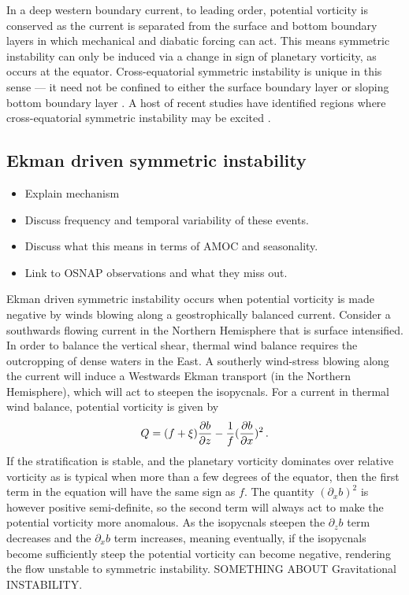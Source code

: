 In a deep western boundary current, to leading order, potential vorticity is conserved as the current is separated from the surface and bottom boundary layers in which mechanical and diabatic forcing can act. This means symmetric instability can only be induced via a change in sign of planetary vorticity, as occurs at the equator. Cross-equatorial symmetric instability is unique in this sense --- it need not be confined to either the surface boundary layer or sloping bottom boundary layer \citep{Haine1998, Wenegrat2020}. A host of recent studies have identified regions where cross-equatorial symmetric instability may be excited \citep{Jakoboski2022, Goldsworth2021, Forryan2021, Zhou2022}.

\subsection{Ekman driven symmetric instability}
\label{sec:EkmanInst}
\begin{itemize}
    \item Explain mechanism
    \item Discuss frequency and temporal variability of these events.
    \item Discuss what this means in terms of AMOC and seasonality.
    \item Link to OSNAP observations and what they miss out.
\end{itemize}
Ekman driven symmetric instability occurs when potential vorticity is made negative by winds blowing along a geostrophically balanced current. Consider a southwards flowing current in the Northern Hemisphere that is surface intensified. In order to balance the vertical shear, thermal wind balance requires the outcropping of dense waters in the East. A southerly wind-stress blowing along the current will induce a Westwards Ekman transport (in the Northern Hemisphere), which will act to steepen the isopycnals. For a current in thermal wind balance, potential vorticity is given by
\begin{equation}
    Q = (f + \xi) \pdv{b}{z} - \frac{1}{f} (\pdv{b}{x})^2 \, .
\end{equation}
If the stratification is stable, and the planetary vorticity dominates over relative vorticity as is typical when more than a few degrees of the equator, then the first term in the equation will have the same sign as $f$. The quantity $(\partial_x b)^2$ is however positive semi-definite, so the second term will always act to make the potential vorticity more anomalous. As the isopycnals steepen the $\partial_zb$ term decreases and the $\partial_x b$ term increases, meaning eventually, if the isopycnals become sufficiently steep the  potential vorticity can become negative, rendering the flow unstable to symmetric instability. SOMETHING ABOUT Gravitational INSTABILITY.








